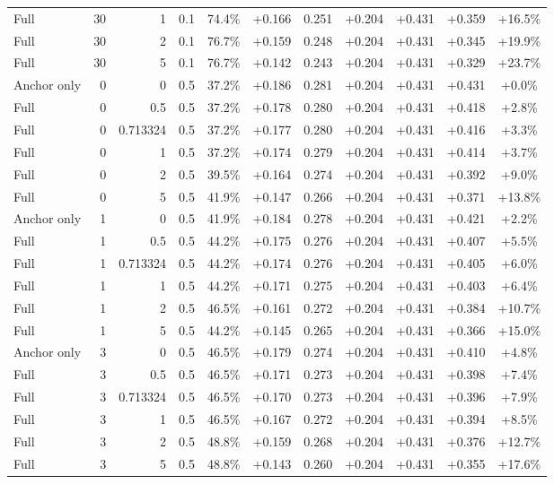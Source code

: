 \begin{table}[htbp]
\begin{tabular}{lrrrccccccc}
Full & 30 & 1 & 0.1 & 74.4\% & +0.166 & 0.251 & +0.204 & +0.431 & +0.359 & +16.5\% \\
Full & 30 & 2 & 0.1 & 76.7\% & +0.159 & 0.248 & +0.204 & +0.431 & +0.345 & +19.9\% \\
Full & 30 & 5 & 0.1 & 76.7\% & +0.142 & 0.243 & +0.204 & +0.431 & +0.329 & +23.7\% \\
Anchor only & 0 & 0 & 0.5 & 37.2\% & +0.186 & 0.281 & +0.204 & +0.431 & +0.431 & +0.0\% \\
Full & 0 & 0.5 & 0.5 & 37.2\% & +0.178 & 0.280 & +0.204 & +0.431 & +0.418 & +2.8\% \\
Full & 0 & 0.713324 & 0.5 & 37.2\% & +0.177 & 0.280 & +0.204 & +0.431 & +0.416 & +3.3\% \\
Full & 0 & 1 & 0.5 & 37.2\% & +0.174 & 0.279 & +0.204 & +0.431 & +0.414 & +3.7\% \\
Full & 0 & 2 & 0.5 & 39.5\% & +0.164 & 0.274 & +0.204 & +0.431 & +0.392 & +9.0\% \\
Full & 0 & 5 & 0.5 & 41.9\% & +0.147 & 0.266 & +0.204 & +0.431 & +0.371 & +13.8\% \\
Anchor only & 1 & 0 & 0.5 & 41.9\% & +0.184 & 0.278 & +0.204 & +0.431 & +0.421 & +2.2\% \\
Full & 1 & 0.5 & 0.5 & 44.2\% & +0.175 & 0.276 & +0.204 & +0.431 & +0.407 & +5.5\% \\
Full & 1 & 0.713324 & 0.5 & 44.2\% & +0.174 & 0.276 & +0.204 & +0.431 & +0.405 & +6.0\% \\
Full & 1 & 1 & 0.5 & 44.2\% & +0.171 & 0.275 & +0.204 & +0.431 & +0.403 & +6.4\% \\
Full & 1 & 2 & 0.5 & 46.5\% & +0.161 & 0.272 & +0.204 & +0.431 & +0.384 & +10.7\% \\
Full & 1 & 5 & 0.5 & 44.2\% & +0.145 & 0.265 & +0.204 & +0.431 & +0.366 & +15.0\% \\
Anchor only & 3 & 0 & 0.5 & 46.5\% & +0.179 & 0.274 & +0.204 & +0.431 & +0.410 & +4.8\% \\
Full & 3 & 0.5 & 0.5 & 46.5\% & +0.171 & 0.273 & +0.204 & +0.431 & +0.398 & +7.4\% \\
Full & 3 & 0.713324 & 0.5 & 46.5\% & +0.170 & 0.273 & +0.204 & +0.431 & +0.396 & +7.9\% \\
Full & 3 & 1 & 0.5 & 46.5\% & +0.167 & 0.272 & +0.204 & +0.431 & +0.394 & +8.5\% \\
Full & 3 & 2 & 0.5 & 48.8\% & +0.159 & 0.268 & +0.204 & +0.431 & +0.376 & +12.7\% \\
Full & 3 & 5 & 0.5 & 48.8\% & +0.143 & 0.260 & +0.204 & +0.431 & +0.355 & +17.6\% \\

\end{tabular}
\end{table}
